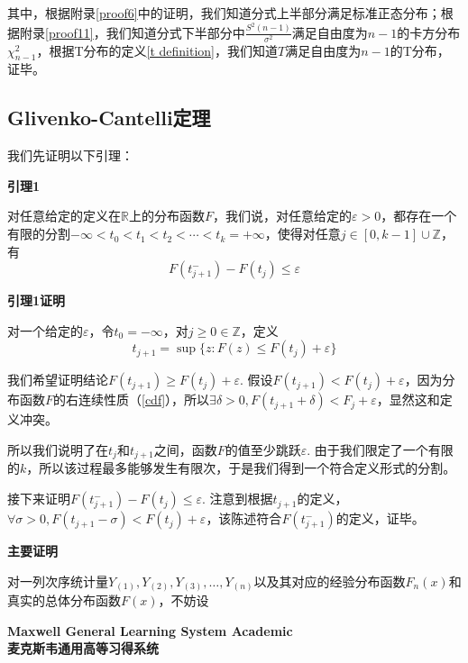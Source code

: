 \documentclass[UTF8]{ctexbook}
\begin{document}
其中，根据附录\ref{proof6}中的证明，我们知道分式上半部分满足标准正态分布；根据附录\ref{proof11}，我们知道分式下半部分中$\frac{S^2(n-1)}{\sigma^2}$满足自由度为$n-1$的卡方分布$\chi_{n-1}^2$，根据T分布的定义\ref{t definition}，我们知道$T$满足自由度为$n-1$的T分布，证毕。

\subsection{Glivenko-Cantelli定理}
\label{glivenko-cantelli-proof}
我们先证明以下引理：

\noindent\textbf{引理1}

对任意给定的定义在$\mathbb{R}$上的分布函数$F$，我们说，对任意给定的$\varepsilon>0$，都存在一个有限的分割$-\infty<t_0<t_1<t_2<\cdots<t_k=+\infty$，使得对任意$j\in[0,k-1]\cup\mathbb{Z}$，有
\[
	F(t_{j+1}^-)-F(t_j)\leq\varepsilon
\]

\noindent\textbf{引理1证明}

对一个给定的$\varepsilon$，令$t_0=-\infty$，对$j\geq0\in\mathbb{Z}$，定义
\[
	t_{j+1}=\sup\{z:F(z)\leq F(t_j)+\varepsilon\}
\]

我们希望证明结论$F(t_{j+1})\geq F(t_j)+\varepsilon$. 假设$F(t_{j+1})< F(t_j)+\varepsilon$，因为分布函数$F$的右连续性质（\ref{cdf}），所以$\exists\delta>0,F(t_{j+1}+\delta)<F_j+\varepsilon$，显然这和定义冲突。

所以我们说明了在$t_{j}$和$t_{j+1}$之间，函数$F$的值至少跳跃$\varepsilon$. 由于我们限定了一个有限的$k$，所以该过程最多能够发生有限次，于是我们得到一个符合定义形式的分割。

接下来证明$F(t_{j+1}^-)-F(t_j)\leq\varepsilon$. 注意到根据$t_{j+1}$的定义，$\forall\sigma>0,F(t_{j+1}-\sigma)<F(t_j)+\varepsilon$，该陈述符合$F(t^-_{j+1})$的定义，证毕。

\noindent\textbf{主要证明}

对一列次序统计量$Y_{(1)},Y_{(2)},Y_{(3)},\dots,Y_{(n)}$以及其对应的经验分布函数$F_n(x)$和真实的总体分布函数$F(x)$，不妨设


\vfill
\noindent \textbf{Maxwell General Learning System Academic}\\
\textbf{麦克斯韦通用高等习得系统}\\
\end{document}
